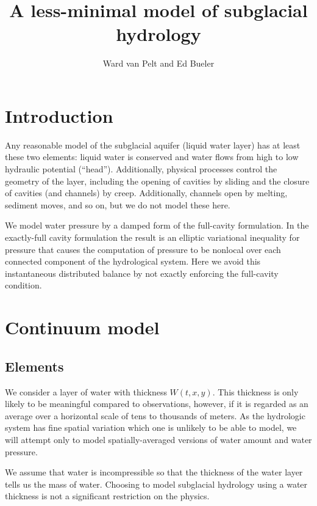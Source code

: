 \documentclass[12pt,final]{amsart}%
\title[]{A less-minimal model of subglacial hydrology}
\author[]{Ward van Pelt and Ed Bueler}
\begin{document}
\maketitle

\thispagestyle{empty}


\section{Introduction}

Any reasonable model of the subglacial aquifer (liquid water layer) has at least these two elements: liquid water is conserved and water flows from high to low hydraulic potential  (``head'').  Additionally, physical processes control the geometry of the layer, including the opening of cavities by sliding and the closure of cavities (and channels) by creep.  Additionally, channels open by melting, sediment moves, and so on, but we do not model these here.

We model water pressure by a damped form of the full-cavity formulation.  In the exactly-full cavity formulation the result is an elliptic variational inequality \citep{Schoofetal2012} for pressure that causes the computation of pressure to be nonlocal over each connected component of the hydrological system.  Here we avoid this instantaneous distributed balance by not exactly enforcing the full-cavity condition.


\section{Continuum model}

\subsection*{Elements}  We consider a layer of water with thickness $W(t,x,y)$.  This thickness is only likely to be meaningful compared to observations, however, if it is regarded as an average over a horizontal scale of tens to thousands of meters.  As the hydrologic system has fine spatial variation which one is unlikely to be able to model, we will attempt only to model spatially-averaged versions of water amount and water pressure.

We assume that water is incompressible so that the thickness of the water layer tells us the mass of water.  Choosing to model subglacial hydrology using a water thickness is not a significant restriction on the physics.
\end{document}
